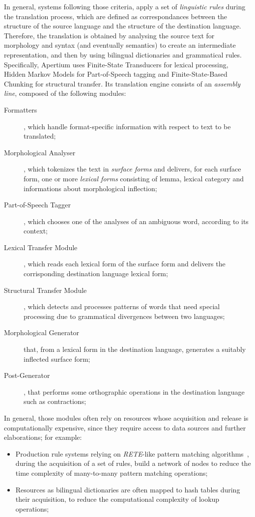 \documentclass[11pt]{article}
\begin{document}
In general, systems following those criteria, apply a set of \emph{linguistic rules} during the translation process, which are defined as correspondances 
between the structure of the source language and the structure of the destination language. Therefore, the translation is obtained by analysing the source 
text for morphology and syntax (and eventually semantics) to create an intermediate representation, and then by using bilingual dictionaries and grammatical
rules.\\

Specifically, Apertium uses Finite-State Transducers for lexical processing, Hidden Markov Models for Part-of-Speech tagging and Finite-State-Based Chunking
for structural transfer. Its translation engine consists of an \emph{assembly line}, composed of the following modules: 

\begin{description}
 \item[Formatters], which handle format-specific information with respect to text to be translated;
 \item[Morphological Analyser], which tokenizes the text in \emph{surface forms} and delivers, for each surface form, one or more \emph{lexical forms}
  consisting of lemma, lexical category and informations about morphological inflection;
 \item[Part-of-Speech Tagger], which chooses one of the analyses of an ambiguous word, according to its context;
 \item[Lexical Transfer Module], which reads each lexical form of the surface form and delivers the corrisponding destination language lexical form;
 \item[Structural Transfer Module], which detects and processes patterns of words that need special processing due to grammatical divergences between two
  languages;
 \item[Morphological Generator] that, from a lexical form in the destination language, generates a suitably inflected surface form;
 \item[Post-Generator], that performs some orthographic operations in the destination language such as contractions;
\end{description}

In general, those modules often rely on resources whose acquisition and release is computationally expensive, since they require access to data sources 
and further elaborations; for example:

\begin{itemize}
 \item Production rule systems relying on \emph{RETE}-like pattern matching algorithms~\citep{forgy}, during the acquisition of a set of rules, build a network of nodes
  to reduce the time complexity of many-to-many pattern matching operations;
 \item Resources as bilingual dictionaries are often mapped to hash tables during their acquisition, to reduce the computational complexity of lookup operations; 
\end{itemize}
\end{document}
